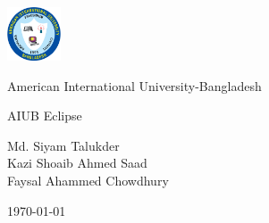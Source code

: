 \begin{titlepage}
\centering
\vspace*{\fill}  %

\includegraphics[width=0.12\textwidth]{images/aiub-logo.png} 
\vspace{0.5cm}  %

{\huge American International University-Bangladesh \par}
\vspace{1cm}  %

{\huge AIUB Eclipse \par}
\vspace{1cm}  %

{\large
Md. Siyam Talukder \\
Kazi Shoaib Ahmed Saad \\
Faysal Ahammed Chowdhury \par
}

\vspace*{\fill}  %

{\large \today \par}

\end{titlepage}
